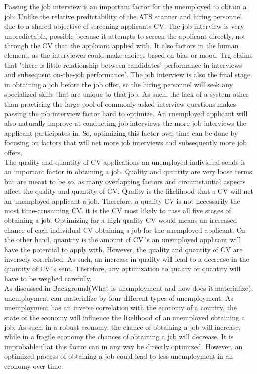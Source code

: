Passing the job interview is an important factor for the unemployed to obtain a job.
Unlike the relative predictability of the ATS scanner and hiring personnel due to a shared objective of screening applicants CV.
The job interview is very unpredictable, possible because it attempts to screen the applicant directly, not through the CV that the applicant applied with.
It also factors in the human element, as the interviewer could make choices based on bias or mood.
Trg claims that "there is little relationship between candidates’ performance in interviews and subsequent on-the-job performance".\cite{Job_Interview}
The job interview is also the final stage in obtaining a job before the job offer, so the hiring personnel will seek any specialized skills that are unique to that job.
As such, the lack of a system other than practicing the large pool of commonly asked interview questions makes passing the job interview factor hard to optimize.\cite{Job_interview_common_questions}
An unemployed applicant will also naturally improve at conducting job interviews the more job interviews the applicant participates in.
So, optimizing this factor over time can be done by focusing on factors that will net more job interviews and subsequently more job offers. \\

The quality and quantity of CV applications an unemployed individual sends is an important factor in obtaining a job.
Quality and quantity are very loose terms but are meant to be so, as many overlapping factors and circumstantial aspects affect the quality and quantity of CV.
Quality is the likelihood that a CV will net an unemployed applicant a job.
Therefore, a quality CV is not necessarily the most time-consuming CV, it is the CV most likely to pass all five stages of obtaining a job.
Optimizing for a high-quality CV would means an increased chance of each individual CV obtaining a job for the unemployed applicant.
On the other hand, quantity is the amount of CV´s an unemployed applicant will have the potential to apply with.
However, the quality and quantity of CV are inversely correlated.
As such, an increase in quality will lead to a decrease in the quantity of CV´s sent.
Therefore, any optimization to quality or quantity will have to be weighed carefully. \\

As discussed in Background(What is unemployment and how does it materialize), unemployment can materialize by four different types of unemployment.
As unemployment has an inverse correlation with the economy of a country, the state of the economy will influence the likelihood of an unemployed obtaining a job.
As such, in a robust economy, the chance of obtaining a job will increase, while in a fragile economy the chances of obtaining a job will decrease.
It is improbable that this factor can in any way be directly optimized.
However, an optimized process of obtaining a job could lead to less unemployment in an economy over time.

